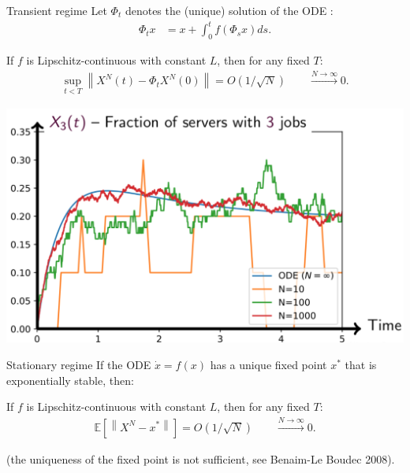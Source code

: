 \documentclass{beamer}
\newcommand\mpage[2]{%
  \begin{minipage}{#1\linewidth}%
    #2%
  \end{minipage}%
}
\newcommand\esp[1]{\mathbb{E}\left[#1\right]}
\newcommand\norm[1]{\left\|#1\right\|}
\begin{document}
\begin{frame}{Transient regime}
  Let $\Phi_t$ denotes the (unique) solution of the ODE : 
  \begin{align*}
    \Phi_tx &= x + \int_0^tf(\Phi_sx)ds.
  \end{align*}\pause 
  
  \begin{theorem}[Kurtz 70s]
    If $f$ is Lipschitz-continuous with constant $L$, then for any
    fixed $T$: 
    \begin{align*}
      \sup_{t<T}\norm{X^N(t) - \Phi_t X^N(0)} = O(1/\sqrt{N}) \qquad \xrightarrow{N\to\infty}0.
    \end{align*}
  \end{theorem}

  \begin{center}
    \mpage{.5}{\includegraphics[width=\linewidth]{clt}}
  \end{center}

  
\end{frame}

\begin{frame}{Stationary regime}
  If the ODE $\dot{x}=f(x)$ has a unique fixed point $x^*$ that is
  exponentially stable, then:
  \begin{theorem}[Ying 2016]
    If $f$ is Lipschitz-continuous with constant $L$, then for any
    fixed $T$: 
    \begin{align*}
      \esp{\norm{X^N - x^*}} = O(1/\sqrt{N}) \qquad \xrightarrow{N\to\infty}0.
    \end{align*}    
  \end{theorem}

  (the uniqueness of the fixed point is not sufficient, see Benaim-Le
  Boudec 2008). 
\end{frame}
\end{document}
